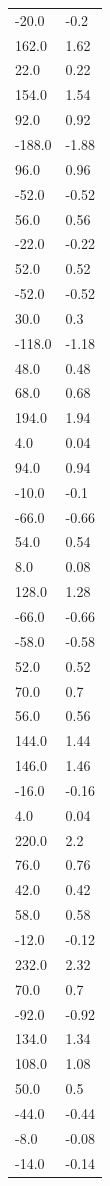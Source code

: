 \begin{longtable}{ll}
-20.0 & -0.2 \\
162.0 & 1.62 \\
22.0 & 0.22 \\
154.0 & 1.54 \\
92.0 & 0.92 \\
-188.0 & -1.88 \\
96.0 & 0.96 \\
-52.0 & -0.52 \\
56.0 & 0.56 \\
-22.0 & -0.22 \\
52.0 & 0.52 \\
-52.0 & -0.52 \\
30.0 & 0.3 \\
-118.0 & -1.18 \\
48.0 & 0.48 \\
68.0 & 0.68 \\
194.0 & 1.94 \\
4.0 & 0.04 \\
94.0 & 0.94 \\
-10.0 & -0.1 \\
-66.0 & -0.66 \\
54.0 & 0.54 \\
8.0 & 0.08 \\
128.0 & 1.28 \\
-66.0 & -0.66 \\
-58.0 & -0.58 \\
52.0 & 0.52 \\
70.0 & 0.7 \\
56.0 & 0.56 \\
144.0 & 1.44 \\
146.0 & 1.46 \\
-16.0 & -0.16 \\
4.0 & 0.04 \\
220.0 & 2.2 \\
76.0 & 0.76 \\
42.0 & 0.42 \\
58.0 & 0.58 \\
-12.0 & -0.12 \\
232.0 & 2.32 \\
70.0 & 0.7 \\
-92.0 & -0.92 \\
134.0 & 1.34 \\
108.0 & 1.08 \\
50.0 & 0.5 \\
-44.0 & -0.44 \\
-8.0 & -0.08 \\
-14.0 & -0.14 \\

\end{longtable}
